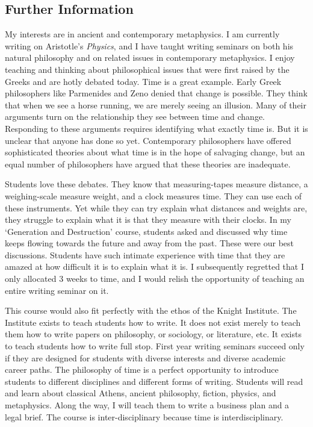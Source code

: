 \documentclass[oneside, 10pt]{article}
\begin{document}
\subsection*{Further Information} 
My interests are in ancient and contemporary metaphysics. I am currently writing on Aristotle's \emph{Physics}, and I have taught writing seminars on both his natural philosophy and on related issues in contemporary metaphysics.  I enjoy teaching and thinking about philosophical issues that were first raised by the Greeks and are hotly debated today. Time is a great example. Early Greek philosophers like Parmenides and Zeno denied that change is possible. They think that when we see a horse running, we are merely seeing an illusion. Many of their arguments turn on the relationship they see between time and change. Responding to these arguments requires identifying what exactly time is. But it is unclear that anyone has done so yet. Contemporary philosophers have offered sophisticated theories about what time is in the hope of salvaging change, but an equal number of philosophers have argued that these theories are inadequate. 

Students love these debates. They know that measuring-tapes measure distance, a weighing-scale measure weight, and a clock measures time. They can use each of these instruments. Yet while they can try explain what distances and weights are, they  struggle to explain what it is that they measure with their clocks. In my `Generation and Destruction' course, students asked and discussed why time keeps flowing towards the future and away from the past. These were our best discussions. Students have such intimate experience with time that they are amazed at how difficult it is to explain what it is. I subsequently regretted that I only allocated 3 weeks to time, and I would relish the opportunity of teaching an entire writing seminar on it.

This course would also fit perfectly with the ethos of the Knight Institute. The Institute exists to teach students how to write. It does not exist merely to teach them how to write papers on philosophy, or sociology, or literature, etc. It exists to teach students how to write full stop. First year writing seminars succeed only if they are designed for students with diverse interests and diverse academic career paths. The philosophy of time is a perfect opportunity to introduce students to different disciplines and different forms of writing. Students will read and learn about classical Athens, ancient philosophy, fiction, physics, and metaphysics.  Along the way, I will teach them to write a business plan and a legal brief. The course is inter-disciplinary because time is interdisciplinary.  
\end{document}
